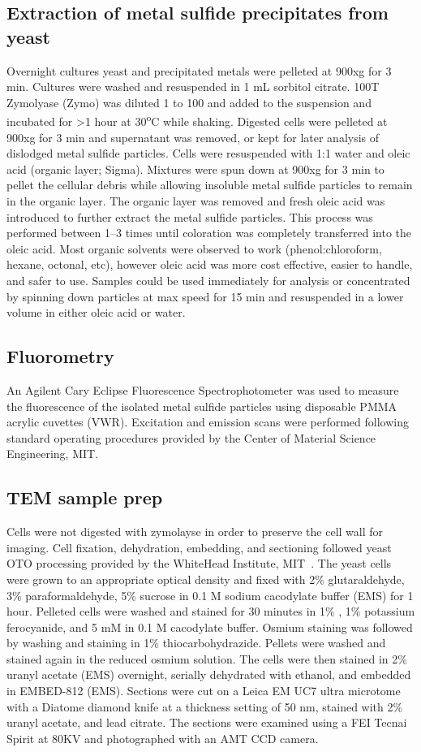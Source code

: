 \documentclass[../main/main]{subfiles}
\begin{document}
\subsection*{Extraction of metal sulfide precipitates from yeast}
Overnight cultures yeast and precipitated metals were pelleted at 900xg for 3 min. Cultures were washed and resuspended in 1 mL sorbitol citrate. 100T Zymolyase (Zymo) was diluted 1 to 100 and added to the suspension and incubated for >1 hour at 30\textsuperscript{o}C while shaking. Digested cells were pelleted at 900xg for 3 min and supernatant was removed, or kept for later analysis of dislodged metal sulfide particles. Cells were resuspended with 1:1 water and oleic acid (organic layer; Sigma). Mixtures were spun down at 900xg for 3 min to pellet the cellular debris while allowing insoluble metal sulfide particles to remain in the organic layer. The organic layer was removed and fresh oleic acid was introduced to further extract the metal sulfide particles. This process was performed between 1--3 times until coloration was completely transferred into the oleic acid. Most organic solvents were observed to work (phenol:chloroform, hexane, octonal, etc), however oleic acid was more cost effective, easier to handle, and safer to use. Samples could be used immediately for analysis or concentrated by spinning down particles at max speed for 15 min and resuspended in a lower volume in either oleic acid or water.

\subsection*{Fluorometry}
An Agilent Cary Eclipse Fluorescence Spectrophotometer was used to measure the fluorescence of the isolated metal sulfide particles using disposable PMMA acrylic cuvettes (VWR). Excitation and emission scans were performed following standard operating procedures provided by the Center of Material Science Engineering, MIT.

\subsection*{TEM sample prep}
Cells were not digested with zymolayse in order to preserve the cell wall for imaging. Cell fixation, dehydration, embedding, and sectioning followed yeast OTO processing provided by the WhiteHead Institute, MIT~\cite{seligman1966}. The yeast cells were grown to an appropriate optical density and fixed with 2\% glutaraldehyde, 3\% paraformaldehyde, 5\% sucrose in 0.1 M sodium cacodylate buffer (EMS) for 1 hour. Pelleted cells were washed and stained for 30 minutes in 1\% , 1\% potassium ferocyanide, and 5 mM  in 0.1 M cacodylate buffer. Osmium staining was followed by washing and staining in 1\% thiocarbohydrazide. Pellets were washed and stained again in the reduced osmium solution. The cells were then stained in 2\% uranyl acetate (EMS) overnight, serially dehydrated with ethanol, and embedded in EMBED-812 (EMS). Sections were cut on a Leica EM UC7 ultra microtome with a Diatome diamond knife at a thickness setting of 50 nm, stained with 2\% uranyl acetate, and lead citrate. The sections were examined using a FEI Tecnai Spirit at 80KV and photographed with an AMT CCD camera.
\end{document}

